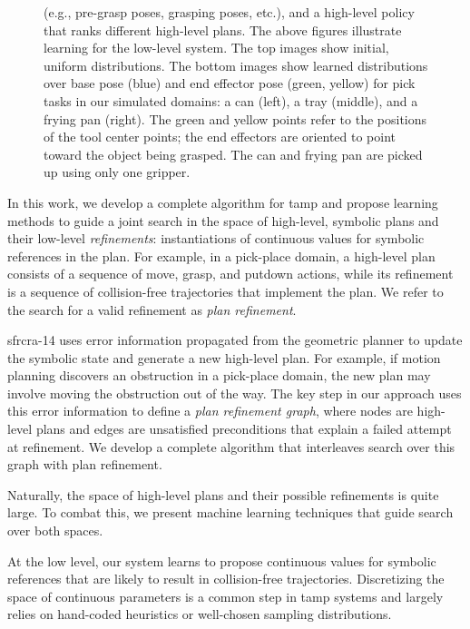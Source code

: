 \begin{figure}[t]
{{      (e.g., pre-grasp poses, grasping poses, etc.), and a high-level
      policy that ranks different high-level plans. The above figures
      illustrate learning for the low-level system. The top images
      show initial, uniform distributions. The bottom images show
      learned distributions over base pose (blue) and end effector
      pose (green, yellow) for pick tasks in our simulated domains: a
      can (left), a tray (middle), and a frying pan (right).  The
      green and yellow points refer to the positions of the tool
      center points; the end effectors are oriented to point toward
      the object being grasped. The can and frying pan are picked up
      using only one gripper.}}
  \label{fig:cover}
\end{figure}

In this work, we develop a complete algorithm for {\sc tamp} and
propose learning methods to guide a joint search in the space of
high-level, symbolic plans and their low-level \emph{refinements}:
instantiations of continuous values for symbolic references in the
plan. For example, in a pick-place domain, a high-level plan consists
of a sequence of move, grasp, and putdown actions, while its
refinement is a sequence of collision-free trajectories that implement
the plan. We refer to the search for a valid refinement as \emph{plan
  refinement}.

{\sc sfrcra-14} uses error information propagated from the geometric
planner to update the symbolic state and generate a new high-level
plan.  For example, if motion planning discovers an obstruction in a
pick-place domain, the new plan may involve moving the obstruction out
of the way.  The key step in our approach uses this error information to define a \emph{plan
  refinement graph}, where nodes are high-level plans and edges are
unsatisfied preconditions that explain a failed attempt at
refinement. We develop a complete algorithm that interleaves search
over this graph with plan refinement.

Naturally, the space of high-level plans and their possible refinements is
quite large. To combat this, we present machine learning techniques
that guide search over both spaces.

At the low
level, our system learns to propose continuous values for symbolic
references that are likely to result in collision-free
trajectories. Discretizing the space of continuous parameters is a
common step in {\sc tamp} systems and largely relies on hand-coded
heuristics or well-chosen sampling distributions. 

